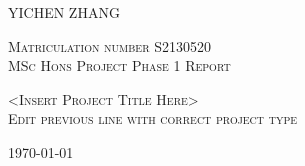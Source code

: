 %
%
%

\thispagestyle{empty}

\begin{titlepage}

  \vspace*{80pt}
  \begin{center}

    \begin{minipage}[c][][t]{8cm}
      \begin{center}

        \textsc{YICHEN ZHANG}

        \textsc{
          \small{Matriculation number S2130520}\\
          \small{MSc Hons Project Phase 1 Report}}

        \textsc{
          <Insert Project Title Here>\\
          Edit previous line with correct project type}


        \textsc{\today}

        \vfill

      \end{center}
    \end{minipage}
  \end{center}

\end{titlepage}

\thispagestyle{empty}
\cleardoublepage
